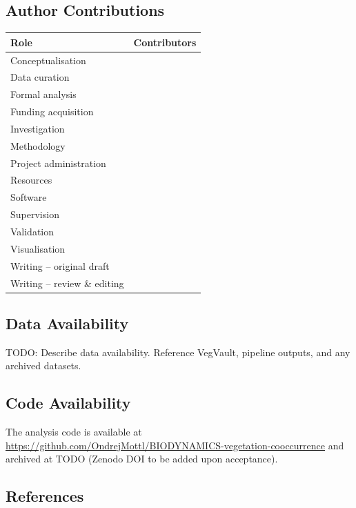 \documentclass[
  12pt,
]{article}
\newcounter{none} %
\begin{document}
\subsection{Author Contributions}\label{author-contributions}

{\def\LTcaptype{none} %
\begin{longtable}[]{@{}ll@{}}
\toprule\noalign{}
Role & Contributors \\
\midrule\noalign{}
\endhead
\bottomrule\noalign{}
\endlastfoot
Conceptualisation & \\
Data curation & \\
Formal analysis & \\
Funding acquisition & \\
Investigation & \\
Methodology & \\
Project administration & \\
Resources & \\
Software & \\
Supervision & \\
Validation & \\
Visualisation & \\
Writing -- original draft & \\
Writing -- review \& editing & \\
\end{longtable}
}

\subsection{Data Availability}\label{data-availability}

TODO: Describe data availability. Reference VegVault, pipeline outputs,
and any archived datasets.

\subsection{Code Availability}\label{code-availability}

The analysis code is available at
\url{https://github.com/OndrejMottl/BIODYNAMICS-vegetation-cooccurrence}
and archived at TODO (Zenodo DOI to be added upon acceptance).

\subsection{References}\label{references}

\protect{}\label{refs}
\end{document}
